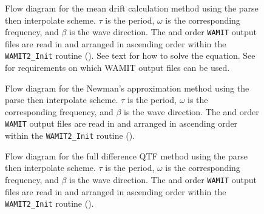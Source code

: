 \begin{figure}[ht]
   \begin{center}
         
      \endpgfgraphicnamed
   \end{center}
\caption{Flow diagram for the mean drift calculation method using the parse then interpolate scheme.  $\tau$ is the period, $\omega$ is the corresponding frequency, and $\beta$ is the wave direction.  The  and  order {\tt WAMIT} output files are read in and arranged in ascending order within the {\tt WAMIT2\_Init} routine ().  See text for how to solve the equation. See  for requirements on which WAMIT output files can be used.
   \label{fig:MeanDrift:Flowchart:ParseInterp}
}
\end{figure}

\begin{figure}[ht]
   \begin{center}
         
      \endpgfgraphicnamed
   \end{center}
\caption{Flow diagram for the Newman's approximation method using the parse then interpolate scheme.  $\tau$ is the period, $\omega$ is the corresponding frequency, and $\beta$ is the wave direction.  The  and  order {\tt WAMIT} output files are read in and arranged in ascending order within the {\tt WAMIT2\_Init} routine ().
   \label{fig:Newman:Flowchart:ParseInterp}
}
\end{figure}

\begin{figure}[ht]
   \begin{center}
         
      \endpgfgraphicnamed
   \end{center}
\caption{Flow diagram for the full difference QTF method using the parse then interpolate scheme.  $\tau$ is the period, $\omega$ is the corresponding frequency, and $\beta$ is the wave direction.  The  and  order {\tt WAMIT} output files are read in and arranged in ascending order within the {\tt WAMIT2\_Init} routine ().
   \label{fig:DiffQTF:Flowchart:ParseInterp}
}
\end{figure}

